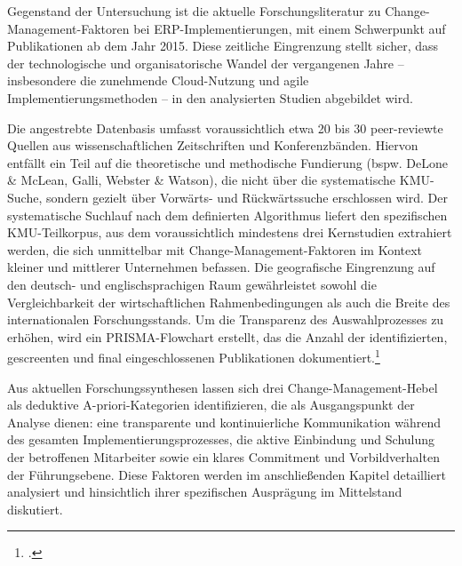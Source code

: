 Gegenstand der Untersuchung ist die aktuelle Forschungsliteratur zu Change-Management-Faktoren bei ERP-Implementierungen, mit einem Schwerpunkt auf Publikationen ab dem Jahr 2015. Diese zeitliche Eingrenzung stellt sicher, dass der technologische und organisatorische Wandel der vergangenen Jahre -- insbesondere die zunehmende Cloud-Nutzung und agile Implementierungsmethoden -- in den analysierten Studien abgebildet wird.

Die angestrebte Datenbasis umfasst voraussichtlich etwa 20 bis 30 peer-reviewte Quellen aus wissenschaftlichen Zeitschriften und Konferenzbänden. Hiervon entfällt ein Teil auf die theoretische und methodische Fundierung (bspw. DeLone \& McLean, Galli, Webster \& Watson), die nicht über die systematische KMU-Suche, sondern gezielt über Vorwärts- und Rückwärtssuche erschlossen wird. Der systematische Suchlauf nach dem definierten Algorithmus liefert den spezifischen KMU-Teilkorpus, aus dem voraussichtlich mindestens drei Kernstudien extrahiert werden, die sich unmittelbar mit Change-Management-Faktoren im Kontext kleiner und mittlerer Unternehmen befassen. Die geografische Eingrenzung auf den deutsch- und englischsprachigen Raum gewährleistet sowohl die Vergleichbarkeit der wirtschaftlichen Rahmenbedingungen als auch die Breite des internationalen Forschungsstands. Um die Transparenz des Auswahlprozesses zu erhöhen, wird ein PRISMA-Flowchart erstellt, das die Anzahl der identifizierten, gescreenten und final eingeschlossenen Publikationen dokumentiert.\footcite[Vgl.][n71]{page2021}

Aus aktuellen Forschungssynthesen lassen sich drei Change-Management-Hebel als deduktive A-priori-Kategorien identifizieren, die als Ausgangspunkt der Analyse dienen: eine transparente und kontinuierliche Kommunikation während des gesamten Implementierungsprozesses, die aktive Einbindung und Schulung der betroffenen Mitarbeiter sowie ein klares Commitment und Vorbildverhalten der Führungsebene. Diese Faktoren werden im anschlie\ss{}enden Kapitel detailliert analysiert und hinsichtlich ihrer spezifischen Ausprägung im Mittelstand diskutiert.
